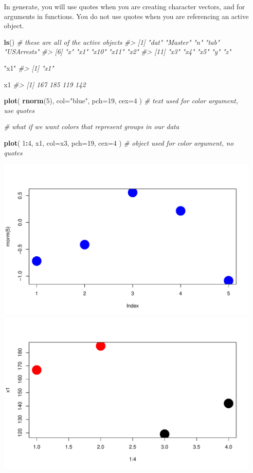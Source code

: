 \documentclass[]{book}
\newenvironment{Shaded}{\begin{snugshade}}{\end{snugshade}}
\newcommand{\CommentTok}[1]{\textcolor[rgb]{0.56,0.35,0.01}{\textit{#1}}}
\newcommand{\DataTypeTok}[1]{\textcolor[rgb]{0.13,0.29,0.53}{#1}}
\newcommand{\DecValTok}[1]{\textcolor[rgb]{0.00,0.00,0.81}{#1}}
\newcommand{\KeywordTok}[1]{\textcolor[rgb]{0.13,0.29,0.53}{\textbf{#1}}}
\newcommand{\NormalTok}[1]{#1}
\newcommand{\OperatorTok}[1]{\textcolor[rgb]{0.81,0.36,0.00}{\textbf{#1}}}
\newcommand{\StringTok}[1]{\textcolor[rgb]{0.31,0.60,0.02}{#1}}
\theoremstyle{definition}
\theoremstyle{definition}
\theoremstyle{definition}
\theoremstyle{remark}
\begin{document}
In generate, you will use quotes when you are creating character
vectors, and for arguments in functions. You do not use quotes when you
are referencing an active object.

\begin{Shaded}
\begin{Highlighting}[]

\KeywordTok{ls}\NormalTok{()   }\CommentTok{# these are all of the active objects}
\CommentTok{#>  [1] "dat"       "Master"    "n"         "tab"       "USArrests"}
\CommentTok{#>  [6] "x"         "x1"        "x10"       "x11"       "x2"       }
\CommentTok{#> [11] "x3"        "x4"        "x5"        "y"         "z"}

\StringTok{"x1"}
\CommentTok{#> [1] "x1"}

\NormalTok{x1}
\CommentTok{#> [1] 167 185 119 142}

\KeywordTok{plot}\NormalTok{( }\KeywordTok{rnorm}\NormalTok{(}\DecValTok{5}\NormalTok{), }\DataTypeTok{col=}\StringTok{"blue"}\NormalTok{, }\DataTypeTok{pch=}\DecValTok{19}\NormalTok{, }\DataTypeTok{cex=}\DecValTok{4}\NormalTok{ )   }\CommentTok{# text used for color argument, use quotes}

\CommentTok{# what if we want colors that represent groups in our data}

\KeywordTok{plot}\NormalTok{( }\DecValTok{1}\OperatorTok{:}\DecValTok{4}\NormalTok{, x1, }\DataTypeTok{col=}\NormalTok{x3, }\DataTypeTok{pch=}\DecValTok{19}\NormalTok{, }\DataTypeTok{cex=}\DecValTok{4}\NormalTok{ )       }\CommentTok{# object used for color argument, no quotes}
\end{Highlighting}
\end{Shaded}

\begin{center}\includegraphics[width=0.7\linewidth]{DS4PS-I_files/figure-latex/unnamed-chunk-38-1} \includegraphics[width=0.7\linewidth]{DS4PS-I_files/figure-latex/unnamed-chunk-38-2} \end{center}
\end{document}
